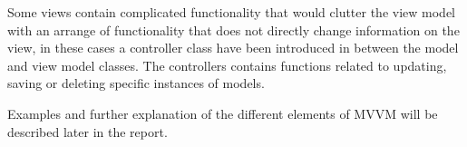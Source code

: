 Some views contain complicated functionality that would clutter the view model with an arrange of functionality that does not directly change information on the view, in these cases a controller class have been introduced in between the model and view model classes. The controllers contains functions related to updating, saving or deleting specific instances of models. 
\par
Examples and further explanation of the different elements of MVVM will be described later in the report. 


